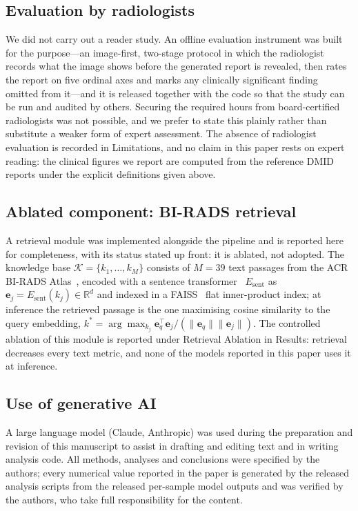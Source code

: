 \documentclass{wlscirep}
\begin{document}
\subsection*{Evaluation by radiologists}

We did not carry out a reader study. An offline evaluation instrument was built for the purpose---an image-first, two-stage protocol in which the radiologist records what the image shows before the generated report is revealed, then rates the report on five ordinal axes and marks any clinically significant finding omitted from it---and it is released together with the code so that the study can be run and audited by others. Securing the required hours from board-certified radiologists was not possible, and we prefer to state this plainly rather than substitute a weaker form of expert assessment. The absence of radiologist evaluation is recorded in Limitations, and no claim in this paper rests on expert reading: the clinical figures we report are computed from the reference DMID reports under the explicit definitions given above.

\subsection*{Ablated component: BI-RADS retrieval}

A retrieval module was implemented alongside the pipeline and is reported here for completeness, with its status stated up front: it is ablated, not adopted. The knowledge base $\mathcal{K} = \{k_1, \ldots, k_M\}$ consists of $M=39$ text passages from the ACR BI-RADS Atlas~\cite{birads2013}, encoded with a sentence transformer~\cite{reimers2019sentencebert} $E_{\text{sent}}$ as $\mathbf{e}_j = E_{\text{sent}}(k_j) \in \mathbb{R}^{d}$ and indexed in a FAISS~\cite{johnson2020faiss} flat inner-product index; at inference the retrieved passage is the one maximising cosine similarity to the query embedding, $k^* = \arg\max_{k_j} \mathbf{e}_q^\top\mathbf{e}_j / (\|\mathbf{e}_q\|\|\mathbf{e}_j\|)$. The controlled ablation of this module is reported under Retrieval Ablation in Results: retrieval decreases every text metric, and none of the models reported in this paper uses it at inference.

\subsection*{Use of generative AI}

A large language model (Claude, Anthropic) was used during the preparation and revision of this manuscript to assist in drafting and editing text and in writing analysis code. All methods, analyses and conclusions were specified by the authors; every numerical value reported in the paper is generated by the released analysis scripts from the released per-sample model outputs and was verified by the authors, who take full responsibility for the content.
\end{document}
